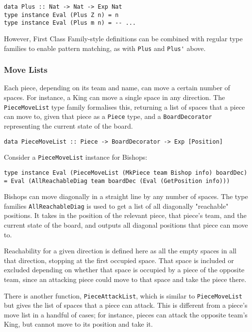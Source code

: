 \documentclass[12pt, a4paper, bibliography=totocnumbered]{scrartcl}
\begin{document}
\begin{lstlisting}
data Plus :: Nat -> Nat -> Exp Nat
type instance Eval (Plus Z n) = n
type instance Eval (Plus m n) = -- ...
\end{lstlisting}

However, First Class Family-style definitions can be combined with regular type families to enable pattern matching, as with \lstinline{Plus} and \lstinline{Plus'} above.

\subsubsection{Move Lists}

Each piece, depending on its team and name, can move a certain number of spaces. For instance, a King can move a single space in any direction. The \lstinline{PieceMoveList} type family formalises this, returning a list of spaces that a piece can move to, given that piece as a \lstinline{Piece} type, and a \lstinline{BoardDecorator} representing the current state of the board.

\begin{lstlisting}
data PieceMoveList :: Piece -> BoardDecorator -> Exp [Position]
\end{lstlisting}

Consider a \lstinline{PieceMoveList} instance for Bishops:

\begin{lstlisting}
type instance Eval (PieceMoveList (MkPiece team Bishop info) boardDec) = Eval (AllReachableDiag team boardDec (Eval (GetPosition info)))
\end{lstlisting}

Bishops can move diagonally in a straight line by any number of spaces. The type families \lstinline{AllReachableDiag} is used to get a list of all diagonally "reachable" positions. It takes in the position of the relevant piece, that piece's team, and the current state of the board, and outputs all diagonal positions that piece can move to.

Reachability for a given direction is defined here as all the empty spaces in all that direction, stopping at the first occupied space. That space is included or excluded depending on whether that space is occupied by a piece of the opposite team, since an attacking piece could move to that space and take the piece there.

There is another function, \lstinline{PieceAttackList}, which is similar to \lstinline{PieceMoveList} but gives the list of spaces that a piece can attack. This is different from a piece's move list in a handful of cases; for instance, pieces can attack the opposite team's King, but cannot move to its position and take it.
\end{document}
